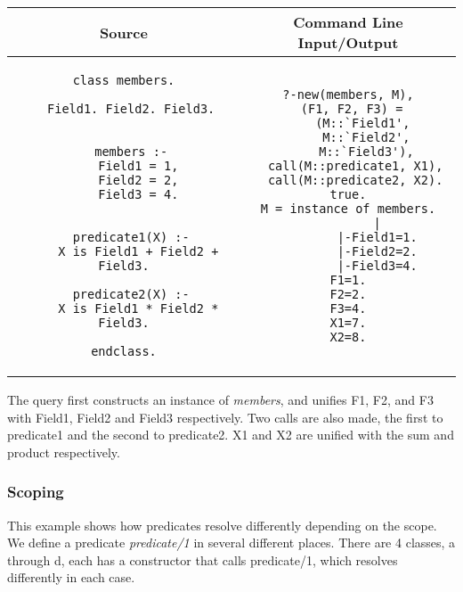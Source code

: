 \documentclass[12pt,a4paper,twoside,openright]{report}
\begin{document}
	\begin{center}
\begin{tabular}{c|c}
Source & Command Line Input/Output \\
\hline
	\small
\begin{lstlisting}
class members.

  Field1. Field2. Field3.
  
  
  members :-
    Field1 = 1,
    Field2 = 2,
    Field3 = 4.


  predicate1(X) :-
    X is Field1 + Field2 + Field3.
    
  predicate2(X) :-
    X is Field1 * Field2 * Field3.
    
endclass.
\end{lstlisting}
&
	\small
\begin{lstlisting}
?-new(members, M),
  (F1, F2, F3) = 
    (M::`Field1',
     M::`Field2',
     M::`Field3'),
  call(M::predicate1, X1),
  call(M::predicate2, X2).
true.
M = instance of members.
        |
        |-Field1=1.
        |-Field2=2.
        |-Field3=4.
F1=1.
F2=2.
F3=4.
X1=7.
X2=8.
\end{lstlisting}
\\
\end{tabular}
\end{center}

The query first constructs an instance of  \emph{members}, and unifies F1, F2, and F3 with Field1, Field2 and Field3 respectively. Two calls are also made, the first to predicate1 and the second to predicate2. X1 and X2 are unified with the sum and product respectively.

	\subsubsection{Scoping}
	
This example shows how predicates resolve differently depending on the scope. We define a predicate \emph{predicate/1} in several different places. There are 4 classes, a through d, each has a constructor that calls predicate/1, which resolves differently in each case.
\end{document}
